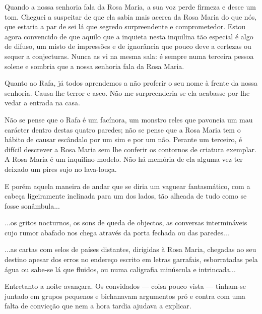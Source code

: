 Quando a nossa senhoria fala da Rosa Maria, a sua voz perde firmeza e
desce um tom. Cheguei a suspeitar de que ela sabia mais acerca da Rosa
Maria do que nós, que estaria a par de sei lá que segredo surpreendente
e comprometedor. Estou agora convencido de que aquilo que a inquieta
nesta inquilina tão especial é algo de difuso, um misto de impressões e
de ignorância que pouco deve a certezas ou sequer a conjecturas. Nunca
as vi na mesma sala: é sempre numa terceira pessoa solene e sombria que
a nossa senhoria fala da Rosa Maria.

Quanto ao Rafa, já todos aprendemos a não proferir o seu nome à frente
da nossa senhoria. Causa-lhe terror e asco. Não me surpreenderia se ela
acabasse por lhe vedar a entrada na casa.

Não se pense que o Rafa é um facínora, um monstro reles que pavoneia um
mau carácter dentro destas quatro paredes;
não se pense que a Rosa Maria tem o hábito de causar escândalo por um
sim e por um não. Perante um terceiro, é difícil descrever a Rosa Maria
sem lhe conferir os contornos de criatura exemplar. A Rosa Maria é um
inquilino-modelo. Não há memória de ela alguma vez ter deixado um pires
sujo no lava-louça.

E porém aquela maneira de andar que se diria um vaguear fantasmático,
com a cabeça ligeiramente inclinada para um dos lados, tão alheada de
tudo como se fosse sonâmbula...

...os gritos nocturnos, os sons de queda de objectos, as conversas
intermináveis cujo rumor abafado nos chega através da porta fechada ou
das paredes...

...as cartas com selos de países distantes, dirigidas à Rosa Maria,
chegadas ao seu destino apesar dos erros no endereço escrito em letras
garrafais, esborratadas pela água ou sabe-se lá que fluidos, ou numa
caligrafia minúscula e intrincada...

Entretanto a noite avançara. Os convidados --- coisa pouco vista ---
tinham-se juntado em grupos pequenos e bichanavam argumentos pró e
contra com uma falta de convicção que nem a hora tardia ajudava a
explicar.

